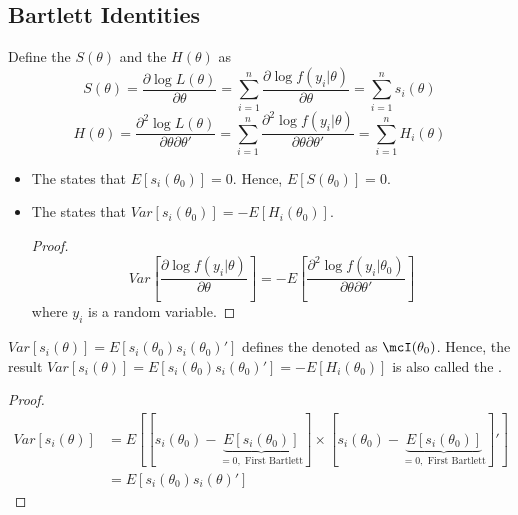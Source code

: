 \subsection{Bartlett Identities}
Define the  $S(\theta)$ and the  $H(\theta)$ as 
\begin{equation}
    S(\theta) = \frac{\partial\log L(\theta)}{\partial\theta} = \sum_{i=1}^{n}\frac{\partial\log f(y_i|\theta)}{\partial\theta}
    = \sum_{i=1}^{n}s_i(\theta)
\end{equation}
\begin{equation}
    H(\theta) = \frac{\partial^2\log L(\theta)}{\partial\theta\partial\theta'} 
    = \sum_{i=1}^{n}\frac{\partial^2\log f(y_i|\theta)}{\partial\theta\partial\theta'}
    = \sum_{i=1}^{n}H_i(\theta)
\end{equation}
\begin{itemize}
    \item The  states that $E[s_i(\theta_0)]=0$. Hence, $E[S(\theta_0)]=0$.
    \item The  states that $Var[s_i(\theta_0)]=-E[H_i(\theta_0)]$.
    \begin{proof}
    \begin{equation*}
        Var\left[\frac{\partial\log f(y_i|\theta)}{\partial\theta}\right] = -E\left[\frac{\partial^2\log f(y_i|\theta_0)}{\partial\theta\partial\theta'}\right]
    \end{equation*}
    where $y_i$ is a random variable.
    \end{proof}
\end{itemize}
$Var[s_i(\theta)] = E[s_i(\theta_0)s_i(\theta_0)']$ defines the 
denoted as $\mcI(\theta_0)$. Hence, the result $Var[s_i(\theta)] = E[s_i(\theta_0)s_i(\theta_0)']=-E[H_i(\theta_0)]$
is also called the .
\begin{proof}
    \begin{align*}
        Var[s_i(\theta)] & = E[[s_i(\theta_0)-\underbrace{E[s_i(\theta_0)]}_{=0,\text{ First Bartlett}}]\times[s_i(\theta_0)-\underbrace{E[s_i(\theta_0)]}_{=0,\text{ First Bartlett}}]']\\
        & = E[s_i(\theta_0)s_i(\theta)']
    \end{align*}
\end{proof}


